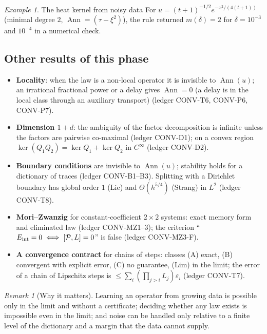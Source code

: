\documentclass[11pt]{article}
\theoremstyle{plain}
\theoremstyle{definition}
\theoremstyle{remark}
\newtheorem{remark}[theorem]{Remark}
\newtheorem{example}[theorem]{Example}
\DeclareMathOperator{\Ann}{Ann}             %
\newcommand{\led}[1]{\textcolor{cG}{\textsf{\footnotesize(ledger #1)}}}
\newenvironment{takeaway}{\begin{remark}[Why it matters]}{\end{remark}}
\begin{document}
\begin{example}{The heat kernel from noisy data}
For $u=(t+1)^{-1/2}e^{-x^2/(4(t+1))}$ (minimal degree $2$, $\Ann=(\tau-\xi^2)$), the rule returned $m(\delta)=2$ for $\delta=10^{-3}$ and $10^{-4}$ in a numerical check.
\end{example}

\subsection{Other results of this phase}

\begin{itemize}
\item \textbf{Locality}: when the law is a non-local operator it is invisible to $\Ann(u)$; an irrational fractional power or a delay gives $\Ann=0$ (a delay is in the local class through an auxiliary transport) \led{CONV-T6, CONV-P6, CONV-P7}.
\item \textbf{Dimension $1+d$}: the ambiguity of the factor decomposition is infinite unless the factors are pairwise co-maximal \led{CONV-D1}; on a convex region $\ker(Q_1Q_2)=\ker Q_1+\ker Q_2$ in $C^\infty$ \led{CONV-D2}.
\item \textbf{Boundary conditions} are invisible to $\Ann(u)$; stability holds for a dictionary of traces \led{CONV-B1--B3}. Splitting with a Dirichlet boundary has global order $1$ (Lie) and $\Theta(h^{5/4})$ (Strang) in $L^2$ \led{CONV-T8}.
\item \textbf{Mori--Zwanzig} for constant-coefficient $2\times2$ systems: exact memory form and eliminated law \led{CONV-MZ1--3}; the criterion ``$E_{\rm int}=0\iff[\mathcal P,L]=0$'' is false \led{CONV-MZ3-F}.
\item \textbf{A convergence contract} for chains of steps: classes (A) exact, (B) convergent with explicit error, (C) no guarantee, (Lim) in the limit; the error of a chain of Lipschitz steps is $\le\sum_i(\prod_{j>i}L_j)\varepsilon_i$ \led{CONV-T7}.
\end{itemize}

\begin{takeaway}
Learning an operator from growing data is possible only in the limit and without a certificate; deciding whether any law exists is impossible even in the limit; and noise can be handled only relative to a finite level of the dictionary and a margin that the data cannot supply.
\end{takeaway}

\end{document}
